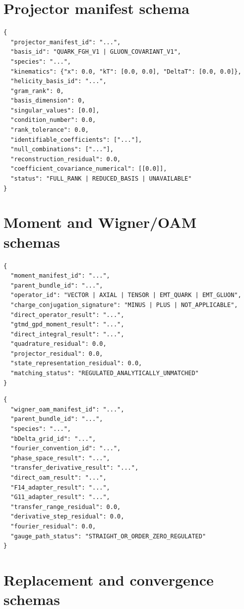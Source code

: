 \documentclass[11pt]{article}
\begin{document}
\section{Projector manifest schema}

\begin{verbatim}
{
  "projector_manifest_id": "...",
  "basis_id": "QUARK_FGH_V1 | GLUON_COVARIANT_V1",
  "species": "...",
  "kinematics": {"x": 0.0, "kT": [0.0, 0.0], "DeltaT": [0.0, 0.0]},
  "helicity_basis_id": "...",
  "gram_rank": 0,
  "basis_dimension": 0,
  "singular_values": [0.0],
  "condition_number": 0.0,
  "rank_tolerance": 0.0,
  "identifiable_coefficients": ["..."],
  "null_combinations": ["..."],
  "reconstruction_residual": 0.0,
  "coefficient_covariance_numerical": [[0.0]],
  "status": "FULL_RANK | REDUCED_BASIS | UNAVAILABLE"
}
\end{verbatim}

\section{Moment and Wigner/OAM schemas}

\begin{verbatim}
{
  "moment_manifest_id": "...",
  "parent_bundle_id": "...",
  "operator_id": "VECTOR | AXIAL | TENSOR | EMT_QUARK | EMT_GLUON",
  "charge_conjugation_signature": "MINUS | PLUS | NOT_APPLICABLE",
  "direct_operator_result": "...",
  "gtmd_gpd_moment_result": "...",
  "direct_integral_result": "...",
  "quadrature_residual": 0.0,
  "projector_residual": 0.0,
  "state_representation_residual": 0.0,
  "matching_status": "REGULATED_ANALYTICALLY_UNMATCHED"
}
\end{verbatim}

\begin{verbatim}
{
  "wigner_oam_manifest_id": "...",
  "parent_bundle_id": "...",
  "species": "...",
  "bDelta_grid_id": "...",
  "fourier_convention_id": "...",
  "phase_space_result": "...",
  "transfer_derivative_result": "...",
  "direct_oam_result": "...",
  "F14_adapter_result": "...",
  "G11_adapter_result": "...",
  "transfer_range_residual": 0.0,
  "derivative_step_residual": 0.0,
  "fourier_residual": 0.0,
  "gauge_path_status": "STRAIGHT_OR_ORDER_ZERO_REGULATED"
}
\end{verbatim}

\section{Replacement and convergence schemas}
\end{document}
